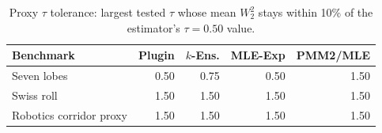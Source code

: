 \begin{table}[t]
\centering
\caption{Proxy $\tau$ tolerance: largest tested $\tau$ whose mean $W_2^2$ stays within 10\% of the estimator's $\tau=0.50$ value.}
\label{tab:tau_tolerance}
\begin{tabular}{lrrrr}
\toprule
Benchmark & Plugin & $k$-Ens. & MLE-Exp & PMM2/MLE \\
\midrule
Seven lobes & 0.50 & 0.75 & 0.50 & 1.50 \\
Swiss roll & 1.50 & 1.50 & 1.50 & 1.50 \\
Robotics corridor proxy & 1.50 & 1.50 & 1.50 & 1.50 \\
\bottomrule
\end{tabular}
\end{table}
